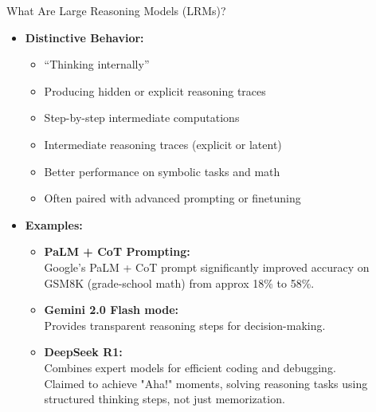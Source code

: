 \begin{frame}[allowframebreaks]{What Are Large Reasoning Models (LRMs)?}
\begin{itemize}
\begin{minipage}{\dimexpr\textwidth-1cm\relax}
\begin{columns}[T]
\begin{column}{0.48\linewidth}
\begin{itemize}
                    \end{itemize}
                \end{column}
            \end{columns}
        \end{minipage}
    \framebreak
        \item \textbf{Distinctive Behavior:}
        \begin{itemize}
            \setlength{\itemsep}{0.5em} %
            \item “Thinking internally” 
            \item Producing hidden or explicit reasoning traces
            \item Step-by-step intermediate computations
            \item Intermediate reasoning traces (explicit or latent)
            \item Better performance on symbolic tasks and math
            \item Often paired with advanced prompting or finetuning
        \end{itemize}
    \framebreak
        \item \textbf{Examples:}
        \begin{itemize}
            \setlength{\itemsep}{0.5em} 
            \item \textbf{PaLM + CoT Prompting:} \\
                Google’s PaLM + CoT prompt significantly improved accuracy on GSM8K (grade-school math) from approx 18\% to 58\%.
            \item \textbf{Gemini 2.0 Flash mode:} \\
                Provides transparent reasoning steps for decision-making.
            \item \textbf{DeepSeek R1:} \\
                Combines expert models for efficient coding and debugging. \\
                Claimed to achieve "Aha!" moments, solving reasoning tasks using structured thinking steps, not just memorization.
        \end{itemize}
    \end{itemize}

\end{frame}

